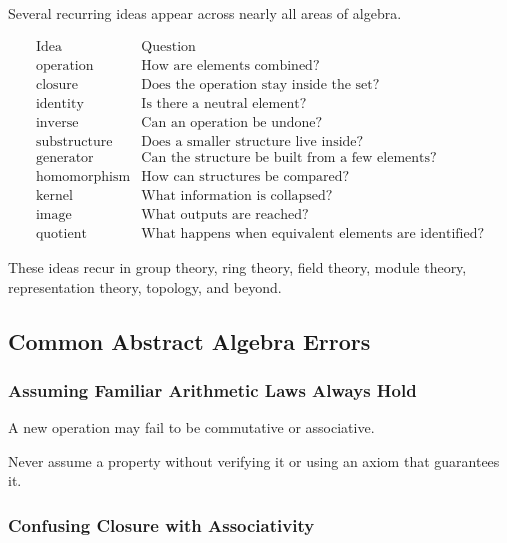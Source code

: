 Several recurring ideas appear across nearly all areas of algebra.

\[
\begin{array}{c|c}
\text{Idea} & \text{Question}\\
\hline
\text{operation} & \text{How are elements combined?}\\
\text{closure} & \text{Does the operation stay inside the set?}\\
\text{identity} & \text{Is there a neutral element?}\\
\text{inverse} & \text{Can an operation be undone?}\\
\text{substructure} & \text{Does a smaller structure live inside?}\\
\text{generator} & \text{Can the structure be built from a few elements?}\\
\text{homomorphism} & \text{How can structures be compared?}\\
\text{kernel} & \text{What information is collapsed?}\\
\text{image} & \text{What outputs are reached?}\\
\text{quotient} & \text{What happens when equivalent elements are identified?}
\end{array}
\]

These ideas recur in group theory, ring theory, field theory, module theory,
representation theory, topology, and beyond.

\subsection{Common Abstract Algebra Errors}
\label{subsec:common-abstract-algebra-errors}

\subsubsection{Assuming Familiar Arithmetic Laws Always Hold}

A new operation may fail to be commutative or associative.

Never assume a property without verifying it or using an axiom that guarantees
it.

\subsubsection{Confusing Closure with Associativity}
\label{subsec:error-closure-associativity}


